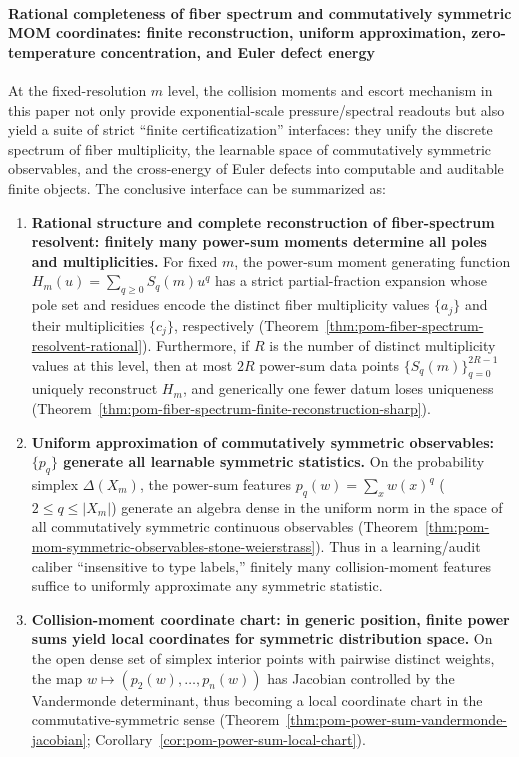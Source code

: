 \paragraph{Rational completeness of fiber spectrum and commutatively symmetric MOM coordinates: finite reconstruction, uniform approximation, zero-temperature concentration, and Euler defect energy}
At the fixed-resolution \(m\) level, the collision moments and escort mechanism in this paper not only provide exponential-scale pressure/spectral readouts but also yield a suite of strict ``finite certificatization'' interfaces: they unify the discrete spectrum of fiber multiplicity, the learnable space of commutatively symmetric observables, and the cross-energy of Euler defects into computable and auditable finite objects. The conclusive interface can be summarized as:
\begin{enumerate}
  \item \textbf{Rational structure and complete reconstruction of fiber-spectrum resolvent: finitely many power-sum moments determine all poles and multiplicities.}
  For fixed \(m\), the power-sum moment generating function \(H_m(u)=\sum_{q\ge 0}S_q(m)u^q\) has a strict partial-fraction expansion whose pole set and residues encode the distinct fiber multiplicity values \(\{a_j\}\) and their multiplicities \(\{c_j\}\), respectively (Theorem~\ref{thm:pom-fiber-spectrum-resolvent-rational}).
  Furthermore, if \(R\) is the number of distinct multiplicity values at this level, then at most \(2R\) power-sum data points \(\{S_q(m)\}_{q=0}^{2R-1}\) uniquely reconstruct \(H_m\), and generically one fewer datum loses uniqueness (Theorem~\ref{thm:pom-fiber-spectrum-finite-reconstruction-sharp}).

  \item \textbf{Uniform approximation of commutatively symmetric observables: \texorpdfstring{$\{p_q\}$}{pq} generate all learnable symmetric statistics.}
  On the probability simplex \(\Delta(X_m)\), the power-sum features \(p_q(w)=\sum_x w(x)^q\) (\(2\le q\le |X_m|\)) generate an algebra dense in the uniform norm in the space of all commutatively symmetric continuous observables (Theorem~\ref{thm:pom-mom-symmetric-observables-stone-weierstrass}).
  Thus in a learning/audit caliber ``insensitive to type labels,'' finitely many collision-moment features suffice to uniformly approximate any symmetric statistic.

  \item \textbf{Collision-moment coordinate chart: in generic position, finite power sums yield local coordinates for symmetric distribution space.}
  On the open dense set of simplex interior points with pairwise distinct weights, the map \(w\mapsto(p_2(w),\dots,p_n(w))\) has Jacobian controlled by the Vandermonde determinant, thus becoming a local coordinate chart in the commutative-symmetric sense (Theorem~\ref{thm:pom-power-sum-vandermonde-jacobian}; Corollary~\ref{cor:pom-power-sum-local-chart}).


\end{enumerate}
